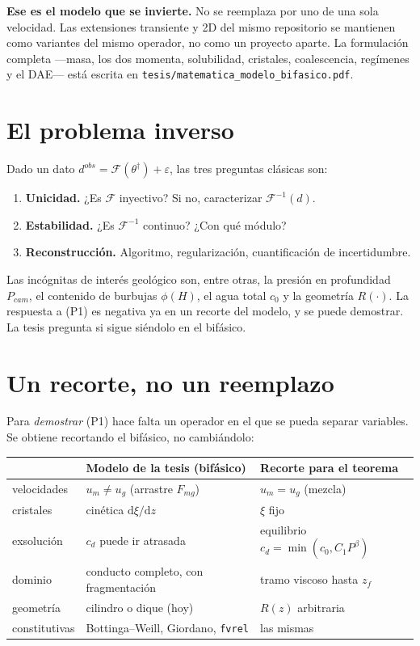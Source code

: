\documentclass[11pt,a4paper]{article}
\theoremstyle{plain}
\theoremstyle{definition}
\theoremstyle{remark}
\begin{document}
\textbf{Ese es el modelo que se invierte.} No se reemplaza por uno de una sola
velocidad. Las extensiones transiente y 2D del mismo repositorio se mantienen
como variantes del mismo operador, no como un proyecto aparte. La formulación
completa ---masa, los dos momenta, solubilidad, cristales, coalescencia,
regímenes y el DAE--- está escrita en
\texttt{tesis/matematica\_modelo\_bifasico.pdf}.

\section{El problema inverso}

Dado un dato $d^{obs}=\mathcal{F}(\theta^\dagger)+\varepsilon$, las tres
preguntas clásicas son:

\begin{enumerate}
\item[(P1)] \textbf{Unicidad.} ¿Es $\mathcal{F}$ inyectivo? Si no, caracterizar
  $\mathcal{F}^{-1}(d)$.
\item[(P2)] \textbf{Estabilidad.} ¿Es $\mathcal{F}^{-1}$ continuo? ¿Con qué
  módulo?
\item[(P3)] \textbf{Reconstrucción.} Algoritmo, regularización, cuantificación
  de incertidumbre.
\end{enumerate}

Las incógnitas de interés geológico son, entre otras, la presión en
profundidad $P_{cam}$, el contenido de burbujas $\phi(H)$, el agua total $c_0$
y la geometría $R(\cdot)$. La respuesta a (P1) es negativa ya en un recorte
del modelo, y se puede demostrar. La tesis pregunta si sigue siéndolo en el
bifásico.

\section{Un recorte, no un reemplazo}

Para \emph{demostrar} (P1) hace falta un operador en el que se pueda separar
variables. Se obtiene recortando el bifásico, no cambiándolo:

\begin{center}
\begin{tabular}{@{}lll@{}}
\toprule
 & \textbf{Modelo de la tesis (bifásico)} & \textbf{Recorte para el teorema} \\
\midrule
velocidades & $u_m\neq u_g$ (arrastre $F_{mg}$) & $u_m=u_g$ (mezcla) \\
cristales & cinética $\mathrm{d}\xi/\mathrm{d}z$ & $\xi$ fijo \\
exsolución & $c_d$ puede ir atrasada & equilibrio $c_d=\min(c_0,C_1P^\beta)$ \\
dominio & conducto completo, con fragmentación & tramo viscoso hasta $z_f$ \\
geometría & cilindro o dique (hoy) & $R(z)$ arbitraria \\
constitutivas & Bottinga--Weill, Giordano, \texttt{fvrel} & las mismas \\
\bottomrule
\end{tabular}
\end{center}
\end{document}
